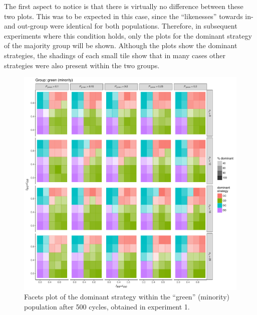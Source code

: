 The first aspect to notice is that there is virtually no difference between these two plots. This was to be expected in this case, since the ``likenesses'' towards in- and out-group were identical for both populations. Therefore, in subsequent experiments where this condition holds, only the plots for the dominant strategy of the majority group will be shown. Although the plots show the dominant strategies, the shadings of each small tile show that in many cases other strategies were also present within the two groups.
\begin{figure}[t!]
	\label{fig:strategyImmigrantExperiment1}
	\begin{minipage}[c]{0.2\linewidth}
		\caption{Facets plot of the dominant strategy within the ``green'' (minority) population after 500 cycles, obtained in experiment 1.}
	\end{minipage}
	\begin{minipage}[c]{0.75\linewidth}
		\includegraphics[trim={0cm 0cm 0.4cm 0cm}, clip, width=\linewidth]{figures/strategyImmigrantExperiment1.pdf}
	\end{minipage}
\end{figure}

